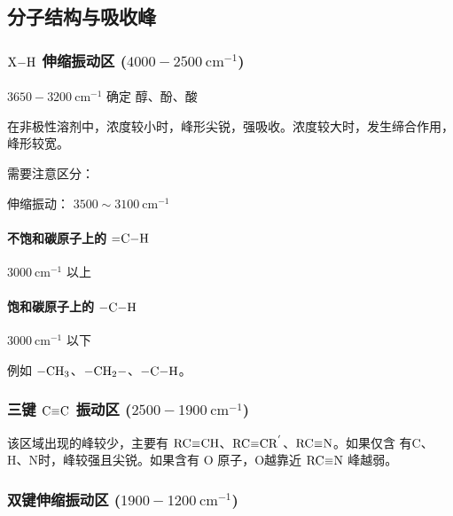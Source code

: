 \subsection{分子结构与吸收峰}

\subsubsection{$\ce{X-H}$ 伸缩振动区 ($4000 - 2500 \ \mathrm{cm}^{-1}$)}


\paragraph{} $3650 - 3200 \ \mathrm{cm}^{-1}$ 确定 醇、酚、酸

在非极性溶剂中，浓度较小时，峰形尖锐，强吸收。浓度较大时，发生缔合作用，峰形较宽。

需要注意区分：

 伸缩振动： $3500 \sim 3100 \ \mathrm{cm}^{-1}$

\vspace{0.5em}


\paragraph{不饱和碳原子上的 $\ce{=C-H}$}

$3000 \ \mathrm{cm}^{-1}$ 以上

\paragraph{饱和碳原子上的 $\ce{-C-H}$}

$3000 \ \mathrm{cm}^{-1}$ 以下

例如 $\ce{-CH3}$、$\ce{-CH2-}$、$\ce{-C-H}$。

\subsubsection{三键 $\ce{C#C}$ 振动区 ($2500 - 1900 \ \mathrm{cm}^{-1}$)}

该区域出现的峰较少，主要有 $\ce{RC#CH}$、$\ce{RC#CR^'}$、$\ce{RC#N}$。如果仅含
有C、H、N时，峰较强且尖锐。如果含有 O  原子，O越靠近 $\ce{RC#N}$ 峰越弱。


\subsubsection{双键伸缩振动区 ($1900 - 1200 \ \mathrm{cm}^{-1}$)}


